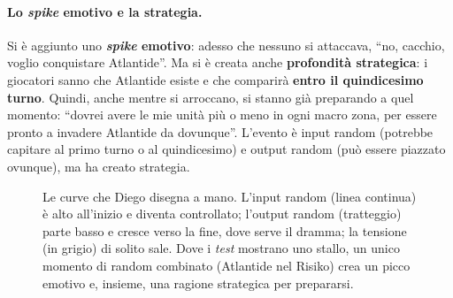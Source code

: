 \paragraph{Lo \emph{spike} emotivo e la strategia.} Si è aggiunto uno \textbf{\emph{spike}
emotivo}: adesso che nessuno si attaccava, ``no, cacchio, voglio conquistare Atlantide''. Ma
si è creata anche \textbf{profondità strategica}: i giocatori sanno che Atlantide esiste e che
comparirà \textbf{entro il quindicesimo turno}. Quindi, anche mentre si arroccano, si stanno
già preparando a quel momento: ``dovrei avere le mie unità più o meno in ogni macro zona, per
essere pronto a invadere Atlantide da dovunque''. L'evento è input random (potrebbe capitare al
primo turno o al quindicesimo) e output random (può essere piazzato ovunque), ma ha creato
strategia.

\begin{figure}[htbp]
\centering
{}
\caption{Le curve che Diego disegna a mano. L'input random (linea continua) è alto
all'inizio e diventa controllato; l'output random (tratteggio) parte basso e cresce verso la
fine, dove serve il dramma; la tensione (in grigio) di solito sale. Dove i \emph{test}
mostrano uno stallo, un unico momento di random combinato (Atlantide nel Risiko) crea un
picco emotivo e, insieme, una ragione strategica per prepararsi.}
\label{a15:fig:curve}
\end{figure}

